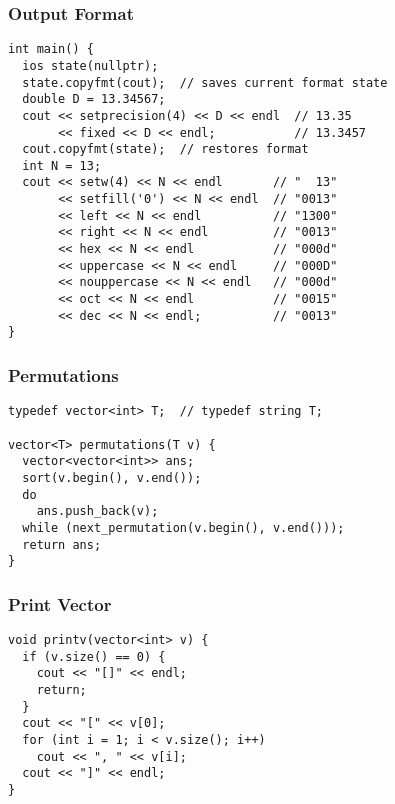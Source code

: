 \documentclass[twoside]{article}
\newcommand{\fileTitleStyle}{\large\underline}
\begin{document}
\begin{multicols*}{2}
\subsubsectionfont{\centering\bfseries\Large}
\subsubsectionfont{\fileTitleStyle}
\subsubsection*{Output Format}
\begin{verbatim}
int main() {
  ios state(nullptr);
  state.copyfmt(cout);  // saves current format state
  double D = 13.34567;
  cout << setprecision(4) << D << endl  // 13.35
       << fixed << D << endl;           // 13.3457
  cout.copyfmt(state);  // restores format
  int N = 13;
  cout << setw(4) << N << endl       // "  13"
       << setfill('0') << N << endl  // "0013"
       << left << N << endl          // "1300"
       << right << N << endl         // "0013"
       << hex << N << endl           // "000d"
       << uppercase << N << endl     // "000D"
       << nouppercase << N << endl   // "000d"
       << oct << N << endl           // "0015"
       << dec << N << endl;          // "0013"
}
\end{verbatim}

\subsubsectionfont{\centering\bfseries\Large}
\subsubsectionfont{\fileTitleStyle}
\subsubsection*{Permutations}
\begin{verbatim}
typedef vector<int> T;  // typedef string T;

vector<T> permutations(T v) {
  vector<vector<int>> ans;
  sort(v.begin(), v.end());
  do
    ans.push_back(v);
  while (next_permutation(v.begin(), v.end()));
  return ans;
}
\end{verbatim}

\subsubsectionfont{\centering\bfseries\Large}
\subsubsectionfont{\fileTitleStyle}
\subsubsection*{Print Vector}
\begin{verbatim}
void printv(vector<int> v) {
  if (v.size() == 0) {
    cout << "[]" << endl;
    return;
  }
  cout << "[" << v[0];
  for (int i = 1; i < v.size(); i++)
    cout << ", " << v[i];
  cout << "]" << endl;
}
\end{verbatim}


\end{multicols*}
\end{document}
